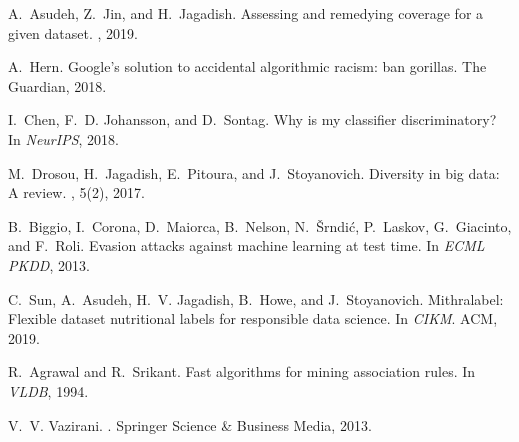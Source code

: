 \documentclass[11pt]{article}
\begin{document}
\begin{thebibliography}{10}
\begin{small}
A.~Asudeh, Z.~Jin, and H.~Jagadish.
\newblock Assessing and remedying coverage for a given dataset.
, 2019.

A.~Hern.
\newblock Google's solution to accidental algorithmic racism: ban gorillas.
\newblock The Guardian, 2018.

I.~Chen, F.~D. Johansson, and D.~Sontag.
\newblock Why is my classifier discriminatory?
\newblock In {\em NeurIPS}, 2018.

M.~Drosou, H.~Jagadish, E.~Pitoura, and J.~Stoyanovich.
\newblock Diversity in big data: A review.
, 5(2), 2017.

B.~Biggio, I.~Corona, D.~Maiorca, B.~Nelson, N.~{\v{S}}rndi{\'c}, P.~Laskov,
  G.~Giacinto, and F.~Roli.
\newblock Evasion attacks against machine learning at test time.
\newblock In {\em ECML PKDD}, 2013.

C.~Sun, A.~Asudeh, H.~V. Jagadish, B.~Howe, and J.~Stoyanovich.
\newblock Mithralabel: Flexible dataset nutritional labels for responsible data
  science.
\newblock In {\em CIKM}. ACM, 2019.

R.~Agrawal and R.~Srikant.
\newblock Fast algorithms for mining association rules.
\newblock In {\em VLDB}, 1994.

V.~V. Vazirani.
.
\newblock Springer Science \& Business Media, 2013.

\end{small}
\end{thebibliography}
\end{document}
